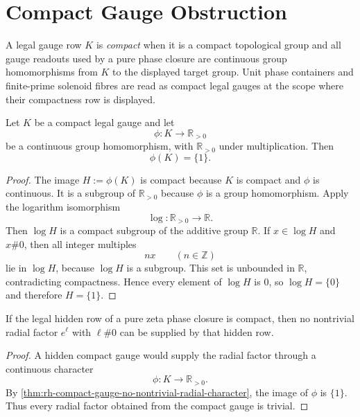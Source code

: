 \section{Compact Gauge Obstruction}
\label{sec:rh-radial-compact-gauge-obstruction}

\begin{definition}
\label{def:rh-compact-legal-gauge}
A legal gauge row $K$ is \emph{compact} when it is a compact topological
group and all gauge readouts used by a pure phase closure are continuous
group homomorphisms from $K$ to the displayed target group. Unit phase
containers and finite-prime solenoid fibres are read as compact legal
gauges at the scope where their compactness row is displayed.
\end{definition}

\begin{theorem}
\label{thm:rh-compact-gauge-no-nontrivial-radial-character}
Let $K$ be a compact legal gauge and let
$$
\phi:K\to\mathbb R_{>0}
$$
be a continuous group homomorphism, with $\mathbb R_{>0}$ under
multiplication. Then
$$
\phi(K)=\{1\}.
$$
\end{theorem}

\begin{proof}
The image $H:=\phi(K)$ is compact because $K$ is compact and $\phi$ is
continuous. It is a subgroup of $\mathbb R_{>0}$ because $\phi$ is a
group homomorphism. Apply the logarithm isomorphism
$$
\log:\mathbb R_{>0}\to\mathbb R.
$$
Then $\log H$ is a compact subgroup of the additive group
$\mathbb R$. If $x\in\log H$ and $x\#0$, then all integer multiples
$$
nx
\qquad
(n\in\mathbb Z)
$$
lie in $\log H$, because $\log H$ is a subgroup. This set is unbounded
in $\mathbb R$, contradicting compactness. Hence every element of
$\log H$ is $0$, so $\log H=\{0\}$ and therefore $H=\{1\}$.
\end{proof}

\begin{corollary}
\label{cor:rh-compact-phase-prime-gauges-cannot-hide-scale}
If the legal hidden row of a pure zeta phase closure is compact, then no
nontrivial radial factor $e^{\ell}$ with $\ell\#0$ can be supplied by
that hidden row.
\end{corollary}

\begin{proof}
A hidden compact gauge would supply the radial factor through a
continuous character
$$
\phi:K\to\mathbb R_{>0}.
$$
By \autoref{thm:rh-compact-gauge-no-nontrivial-radial-character}, the
image of $\phi$ is $\{1\}$. Thus every radial factor obtained from the
compact gauge is trivial.
\end{proof}

